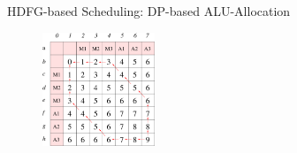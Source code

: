 \documentclass{beamer}
\begin{document}
\begin{CJK}{UTF8}{bkai}
\begin{frame}{HDFG-based Scheduling: DP-based ALU-Allocation}
\begin{figure}[!ht]
\begin{center}
{                                \includegraphics[width=0.3\textwidth]{figs/alloc3.eps}
                            }
                        \end{center}
                        \label{fig:alloc}
                    \end{figure}
            \end{frame}


\end{CJK}
\end{document}
